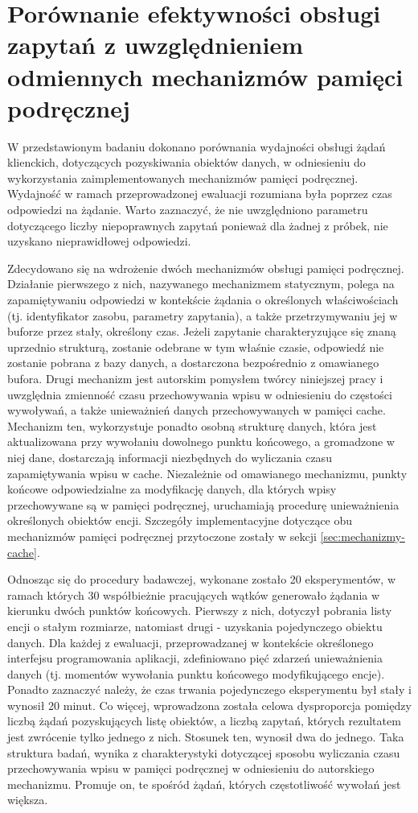 \section{Porównanie efektywności obsługi zapytań z uwzględnieniem odmiennych mechanizmów pamięci podręcznej}
W przedstawionym badaniu dokonano porównania wydajności obsługi żądań klienckich, dotyczących pozyskiwania obiektów danych, w odniesieniu do wykorzystania zaimplementowanych mechanizmów pamięci podręcznej. Wydajność w ramach przeprowadzonej ewaluacji rozumiana była poprzez czas odpowiedzi na żądanie. Warto zaznaczyć, że nie uwzględniono parametru dotyczącego liczby niepoprawnych zapytań ponieważ dla żadnej z próbek, nie uzyskano nieprawidłowej odpowiedzi.

Zdecydowano się na wdrożenie dwóch mechanizmów obsługi pamięci podręcznej. Działanie pierwszego z nich, nazywanego mechanizmem statycznym, polega na zapamiętywaniu odpowiedzi w kontekście żądania o określonych właściwościach (tj. identyfikator zasobu, parametry zapytania), a także przetrzymywaniu jej w buforze przez stały, określony czas. Jeżeli zapytanie charakteryzujące się znaną uprzednio strukturą, zostanie odebrane w tym właśnie czasie, odpowiedź nie zostanie pobrana z bazy danych, a dostarczona bezpośrednio z omawianego bufora. Drugi mechanizm jest autorskim pomysłem twórcy niniejszej pracy i uwzględnia zmienność czasu przechowywania wpisu w odniesieniu do częstości wywoływań, a także unieważnień danych przechowywanych w pamięci cache. Mechanizm ten, wykorzystuje ponadto osobną strukturę danych, która jest aktualizowana przy wywołaniu dowolnego punktu końcowego, a gromadzone w niej dane, dostarczają informacji niezbędnych do wyliczania czasu zapamiętywania wpisu w cache. Niezależnie od omawianego mechanizmu, punkty końcowe odpowiedzialne za modyfikację danych, dla których wpisy przechowywane są w pamięci podręcznej, uruchamiają procedurę unieważnienia określonych obiektów encji. Szczegóły implementacyjne dotyczące obu mechanizmów pamięci podręcznej przytoczone zostały w sekcji \ref{sec:mechanizmy-cache}.

Odnosząc się do procedury badawczej, wykonane zostało 20 eksperymentów, w ramach których 30 współbieżnie pracujących wątków generowało żądania w kierunku dwóch punktów końcowych. Pierwszy z nich, dotyczył pobrania listy encji o stałym rozmiarze, natomiast drugi - uzyskania pojedynczego obiektu danych. Dla każdej z ewaluacji, przeprowadzanej w kontekście określonego interfejsu programowania aplikacji, zdefiniowano pięć zdarzeń unieważnienia danych (tj. momentów wywołania punktu końcowego modyfikującego encje). Ponadto zaznaczyć należy, że czas trwania pojedynczego eksperymentu był stały i wynosił 20 minut. Co więcej, wprowadzona została celowa dysproporcja pomiędzy liczbą żądań pozyskujących listę obiektów, a liczbą zapytań, których rezultatem jest zwrócenie tylko jednego z nich. Stosunek ten, wynosił dwa do jednego. Taka struktura badań, wynika z charakterystyki dotyczącej sposobu wyliczania czasu przechowywania wpisu w pamięci podręcznej w odniesieniu do autorskiego mechanizmu. Promuje on, te spośród żądań, których częstotliwość wywołań jest większa.

